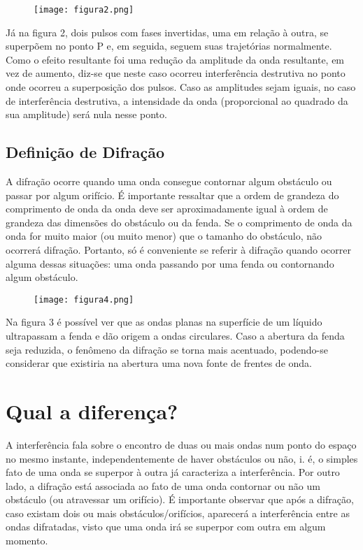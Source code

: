 \documentclass [a4paper, 12pt]{article}
\begin{document}
\begin{figure}[!h]
\centering
{\texttt{[image: figura2.png]}}
\caption{\label{fig:figura 2} \empty}
\end{figure}

Já na figura 2, dois pulsos com fases invertidas, uma em relação à outra, se superpõem no ponto P e, em seguida, seguem suas trajetórias normalmente. Como o efeito resultante foi uma redução da amplitude da onda resultante, em vez de aumento, diz-se que neste caso ocorreu interferência destrutiva no ponto onde ocorreu a superposição dos pulsos. Caso as amplitudes sejam iguais, no caso de interferência destrutiva, a intensidade da onda (proporcional ao quadrado da sua amplitude) será nula nesse ponto.

\subsection{Definição de Difração}

A difração ocorre quando uma onda consegue contornar algum obstáculo ou passar por algum orifício. É importante ressaltar que a ordem de grandeza do comprimento de onda da onda deve ser aproximadamente igual à ordem de grandeza das dimensões do obstáculo ou da fenda. Se o comprimento de onda da onda for muito maior (ou muito menor) que o tamanho do obstáculo, não ocorrerá difração. Portanto, só é conveniente se referir à difração quando ocorrer alguma dessas situações: uma onda passando por uma fenda ou contornando algum obstáculo.

\begin{figure}[!h]
\centering
{\texttt{[image: figura4.png]}}
\caption{\label{fig:figura 4} \empty}
\end{figure}

\newpage

Na figura 3 é possível ver que as ondas planas na superfície de um líquido ultrapassam a fenda e dão origem a ondas circulares. Caso a abertura da fenda seja reduzida, o fenômeno da difração se torna mais acentuado, podendo-se considerar que existiria na abertura uma nova fonte de frentes de onda.


\section{Qual a diferença?}

A interferência fala sobre o encontro de duas ou mais ondas num ponto do espaço no mesmo instante, independentemente de haver obstáculos ou não, i. é, o simples fato de uma onda se superpor à outra já caracteriza a interferência. Por outro lado, a difração está associada ao fato de uma onda contornar ou não um obstáculo (ou atravessar um orifício). É importante observar que após a difração, caso existam dois ou mais obstáculos/orifícios, aparecerá a interferência entre as ondas difratadas, visto que uma onda irá se superpor com outra em algum momento.
\end{document}
